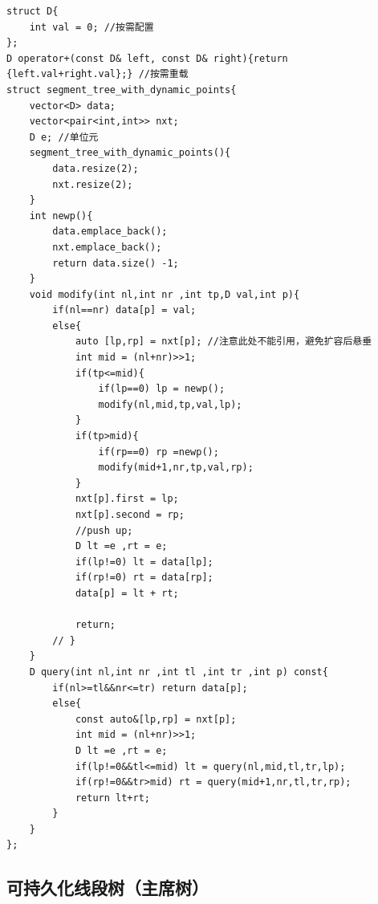 \begin{lstlisting}
struct D{
    int val = 0; //按需配置
};
D operator+(const D& left, const D& right){return {left.val+right.val};} //按需重载
struct segment_tree_with_dynamic_points{
    vector<D> data;
    vector<pair<int,int>> nxt;
    D e; //单位元
    segment_tree_with_dynamic_points(){
        data.resize(2);
        nxt.resize(2);
    }
    int newp(){
        data.emplace_back();
        nxt.emplace_back();
        return data.size() -1;
    }
    void modify(int nl,int nr ,int tp,D val,int p){
        if(nl==nr) data[p] = val;
        else{
            auto [lp,rp] = nxt[p]; //注意此处不能引用，避免扩容后悬垂
            int mid = (nl+nr)>>1;
            if(tp<=mid){
                if(lp==0) lp = newp();
                modify(nl,mid,tp,val,lp);
            }
            if(tp>mid){
                if(rp==0) rp =newp();
                modify(mid+1,nr,tp,val,rp);
            }
            nxt[p].first = lp;
            nxt[p].second = rp;
            //push up;
            D lt =e ,rt = e;
            if(lp!=0) lt = data[lp];
            if(rp!=0) rt = data[rp];
            data[p] = lt + rt;
            
            return;
        // }
    }
    D query(int nl,int nr ,int tl ,int tr ,int p) const{
        if(nl>=tl&&nr<=tr) return data[p];
        else{
            const auto&[lp,rp] = nxt[p];
            int mid = (nl+nr)>>1;
            D lt =e ,rt = e;
            if(lp!=0&&tl<=mid) lt = query(nl,mid,tl,tr,lp);
            if(rp!=0&&tr>mid) rt = query(mid+1,nr,tl,tr,rp);
            return lt+rt;
        }
    }
};
\end{lstlisting}

\subsection{可持久化线段树（主席树）}

